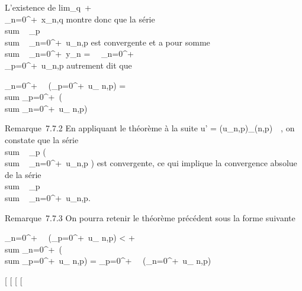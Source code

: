 \documentclass[]{article}
\begin{document}
L'existence de
lim_q\rightarrow~+\infty~~\\\sum
 _n=0^+\infty~x_n,q montre donc que la série
\\sum ~
_p \\sum ~
_n=0^+\infty~u_n,p est convergente et a pour somme
\\sum ~
_n=0^+\infty~y_n =\
\sum ~
_n=0^+\infty~\\\sum
 _p=0^+\infty~u_n,p autrement dit que

\sum _n=0^+\infty~~\left
(\sum _p=0^+\infty~u_
n,p\right ) = \\sum
_p=0^+\infty~\left (\\sum
_n=0^+\infty~u_ n,p\right )

Remarque~7.7.2 En appliquant le théorème à la suite u' =
(u_n,p)_(n,p)\in{}~\times\mathbb{N}~, on constate que
la série \\sum ~
_p\left
(\\sum ~
_n=0^+\infty~u_n,p\right
) est convergente, ce qui implique la convergence absolue de la série
\\sum ~
_p \\sum ~
_n=0^+\infty~u_n,p.

Remarque~7.7.3 On pourra retenir le théorème précédent sous la forme
suivante

\sum _n=0^+\infty~~\left
(\sum _p=0^+\infty~u_
n,p\right ) <
+\infty~\rigtharrow~\\sum
_n=0^+\infty~\left (\\sum
_p=0^+\infty~u_ n,p\right ) =
\sum _p=0^+\infty~~\left
(\sum _n=0^+\infty~u_
n,p\right )

[
[
[
[
\end{document}
